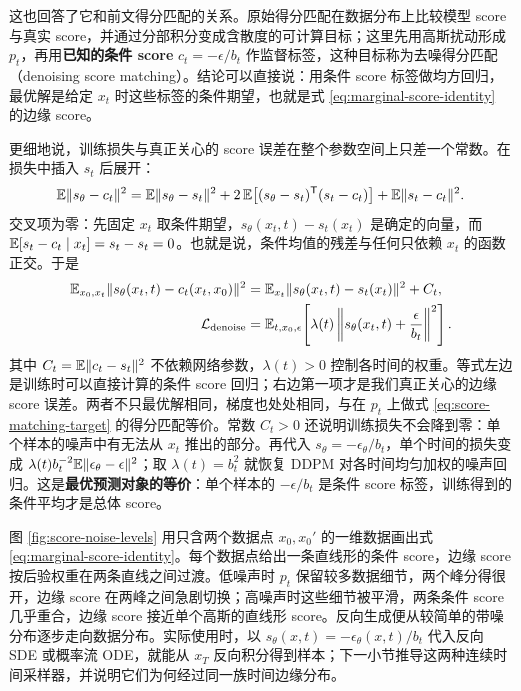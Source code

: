 这也回答了它和前文得分匹配的关系。原始得分匹配在数据分布上比较模型 score 与真实 score，并通过分部积分变成含散度的可计算目标；这里先用高斯扰动形成 \(p_t\)，再用\textbf{已知的条件 score} \(c_t=-\epsilon/b_t\) 作监督标签，这种目标称为去噪得分匹配（denoising score matching）。结论可以直接说：用条件 score 标签做均方回归，最优解是给定 \(x_t\) 时这些标签的条件期望，也就是式 \eqref{eq:marginal-score-identity} 的边缘 score。

更细地说，训练损失与真正关心的 score 误差在整个参数空间上只差一个常数。在损失中插入 \(s_t\) 后展开：
\begin{equation}
 \mathbb{E}\|s_\theta-c_t\|^2
 =\mathbb{E}\|s_\theta-s_t\|^2
 +2\,\mathbb{E}\bigl[(s_\theta-s_t)^{\mathsf T}(s_t-c_t)\bigr]
 +\mathbb{E}\|s_t-c_t\|^2 .
\end{equation}
交叉项为零：先固定 \(x_t\) 取条件期望，\(s_\theta(x_t,t)-s_t(x_t)\) 是确定的向量，而 \(\mathbb{E}[s_t-c_t\mid x_t]=s_t-s_t=0\)。也就是说，条件均值的残差与任何只依赖 \(x_t\) 的函数正交。于是
\begin{align}
 \mathbb{E}_{x_0,x_t}\|s_\theta(x_t,t)-c_t(x_t,x_0)\|^2
 &=\mathbb{E}_{x_t}\|s_\theta(x_t,t)-s_t(x_t)\|^2+C_t,\\
 \mathcal L_{\mathrm{denoise}}
 &=\mathbb{E}_{t,x_0,\epsilon}\!\left[\lambda(t)\left\|s_\theta(x_t,t)+\frac{\epsilon}{b_t}\right\|^2\right].
 \label{eq:denoising-score}
\end{align}
其中 \(C_t=\mathbb{E}\|c_t-s_t\|^2\) 不依赖网络参数，\(\lambda(t)>0\) 控制各时间的权重。等式左边是训练时可以直接计算的条件 score 回归；右边第一项才是我们真正关心的边缘 score 误差。两者不只最优解相同，梯度也处处相同，与在 \(p_t\) 上做式 \eqref{eq:score-matching-target} 的得分匹配等价。常数 \(C_t>0\) 还说明训练损失不会降到零：单个样本的噪声中有无法从 \(x_t\) 推出的部分。再代入 \(s_\theta=-\epsilon_\theta/b_t\)，单个时间的损失变成 \(\lambda(t)b_t^{-2}\mathbb{E}\|\epsilon_\theta-\epsilon\|^2\)；取 \(\lambda(t)=b_t^2\) 就恢复 DDPM 对各时间均匀加权的噪声回归。这是\textbf{最优预测对象的等价}：单个样本的 \(-\epsilon/b_t\) 是条件 score 标签，训练得到的条件平均才是总体 score。

图 \ref{fig:score-noise-levels} 用只含两个数据点 \(x_0,x_0'\) 的一维数据画出式 \eqref{eq:marginal-score-identity}。每个数据点给出一条直线形的条件 score，边缘 score 按后验权重在两条直线之间过渡。低噪声时 \(p_t\) 保留较多数据细节，两个峰分得很开，边缘 score 在两峰之间急剧切换；高噪声时这些细节被平滑，两条条件 score 几乎重合，边缘 score 接近单个高斯的直线形 score。反向生成便从较简单的带噪分布逐步走向数据分布。实际使用时，以 \(s_\theta(x,t)=-\epsilon_\theta(x,t)/b_t\) 代入反向 SDE 或概率流 ODE，就能从 \(x_T\) 反向积分得到样本；下一小节推导这两种连续时间采样器，并说明它们为何经过同一族时间边缘分布。

